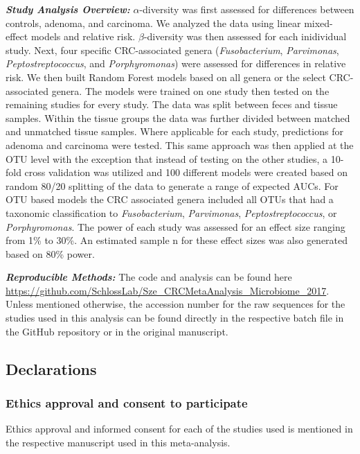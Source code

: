 \documentclass[12pt,]{article}
\begin{document}
\textbf{\emph{Study Analysis Overview:}} \(\alpha\)-diversity was first
assessed for differences between controls, adenoma, and carcinoma. We
analyzed the data using linear mixed-effect models and relative risk.
\(\beta\)-diversity was then assessed for each inidividual study. Next,
four specific CRC-associated genera (\emph{Fusobacterium},
\emph{Parvimonas}, \emph{Peptostreptococcus}, and \emph{Porphyromonas})
were assessed for differences in relative risk. We then built Random
Forest models based on all genera or the select CRC-associated genera.
The models were trained on one study then tested on the remaining
studies for every study. The data was split between feces and tissue
samples. Within the tissue groups the data was further divided between
matched and unmatched tissue samples. Where applicable for each study,
predictions for adenoma and carcinoma were tested. This same approach
was then applied at the OTU level with the exception that instead of
testing on the other studies, a 10-fold cross validation was utilized
and 100 different models were created based on random 80/20 splitting of
the data to generate a range of expected AUCs. For OTU based models the
CRC associated genera included all OTUs that had a taxonomic
classification to \emph{Fusobacterium}, \emph{Parvimonas},
\emph{Peptostreptococcus}, or \emph{Porphyromonas}. The power of each
study was assessed for an effect size ranging from 1\% to 30\%. An
estimated sample n for these effect sizes was also generated based on
80\% power.

\textbf{\emph{Reproducible Methods:}} The code and analysis can be found
here
\url{https://github.com/SchlossLab/Sze_CRCMetaAnalysis_Microbiome_2017}.
Unless mentioned otherwise, the accession number for the raw sequences
for the studies used in this analysis can be found directly in the
respective batch file in the GitHub repository or in the original
manuscript.

\newpage

\subsection{Declarations}\label{declarations}

\subsubsection{Ethics approval and consent to
participate}\label{ethics-approval-and-consent-to-participate}

Ethics approval and informed consent for each of the studies used is
mentioned in the respective manuscript used in this meta-analysis.
\end{document}
